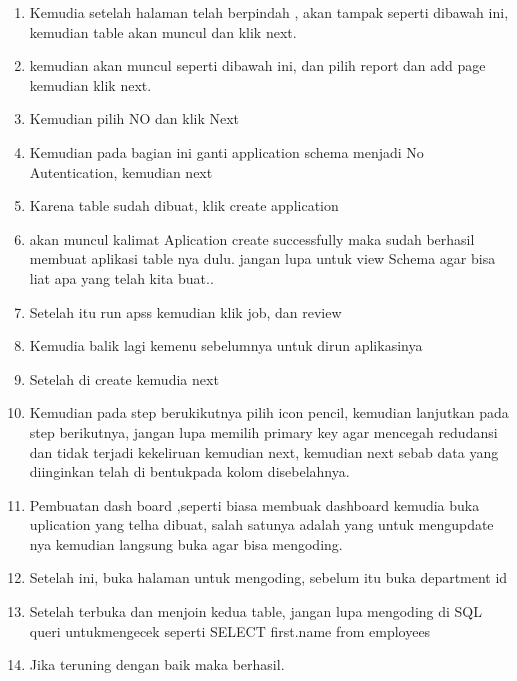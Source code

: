 \documentclass{article}
\begin{document}
\begin{itemize}
\begin{enumerate}
    \item Kemudia setelah halaman telah berpindah , akan tampak seperti dibawah ini, kemudian table akan muncul dan klik next.
    \item kemudian akan muncul seperti dibawah ini, dan pilih report dan add page kemudian  klik next.
    \item Kemudian pilih NO dan klik Next
    \item Kemudian pada bagian ini ganti application schema menjadi No Autentication, kemudian next
    \item Karena  table sudah  dibuat, klik create application
    \item akan muncul kalimat Aplication create successfully maka sudah berhasil membuat aplikasi table nya dulu.
jangan lupa untuk view Schema agar bisa liat apa yang telah kita buat..
    \item Setelah itu run apss kemudian klik job, dan review
    \item Kemudia balik lagi kemenu sebelumnya untuk dirun aplikasinya
    \item Setelah di create  kemudia next
    \item Kemudian pada step berukikutnya pilih icon pencil, kemudian lanjutkan pada step berikutnya, jangan lupa memilih primary key agar mencegah redudansi dan tidak terjadi kekeliruan kemudian next, kemudian next sebab data yang diinginkan telah di bentukpada kolom disebelahnya.
    \item Pembuatan dash board ,seperti biasa membuak dashboard kemudia buka uplication yang telha dibuat, salah satunya adalah yang untuk mengupdate nya kemudian langsung buka agar bisa mengoding.
    \item Setelah ini, buka halaman untuk mengoding, sebelum itu buka department id
    \item Setelah terbuka dan menjoin kedua table, jangan lupa mengoding  di SQL queri untukmengecek seperti SELECT first.name from employees
    \item Jika teruning dengan baik maka berhasil.
\end{enumerate}

\end{itemize}
\end{document}
